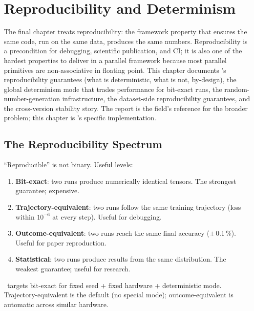 \chapter{Reproducibility and Determinism}
\label{ch:reproducibility}

The final chapter treats reproducibility: the framework
property that ensures the same code, run on the same data,
produces the same numbers. Reproducibility is a precondition
for debugging, scientific publication, and CI; it is also one
of the hardest properties to deliver in a parallel framework
because most parallel primitives are non-associative in
floating point. This chapter documents \Lucid's
reproducibility guarantees (what is deterministic, what is
not, by-design), the global determinism mode that trades
performance for bit-exact runs, the random-number-generation
infrastructure, the dataset-side reproducibility guarantees,
and the cross-version stability story. The
\cite{pineau_reproducibility_2021} report is the field's
reference for the broader problem; this chapter is \Lucid's
specific implementation.

\section{The Reproducibility Spectrum}
\label{sec:reproducibility:spectrum}

``Reproducible'' is not binary. Useful levels:

\begin{enumerate}
  \item \textbf{Bit-exact}: two runs produce numerically
    identical tensors. The strongest guarantee; expensive.
  \item \textbf{Trajectory-equivalent}: two runs follow the
    same training trajectory (loss within $10^{-6}$ at every
    step). Useful for debugging.
  \item \textbf{Outcome-equivalent}: two runs reach the same
    final accuracy ($\pm$\,0.1\,\%). Useful for paper
    reproduction.
  \item \textbf{Statistical}: two runs produce results from
    the same distribution. The weakest guarantee; useful for
    research.
\end{enumerate}

\Lucid\ targets bit-exact for fixed seed + fixed hardware +
deterministic mode. Trajectory-equivalent is the default
(no special mode); outcome-equivalent is automatic across
similar hardware.

